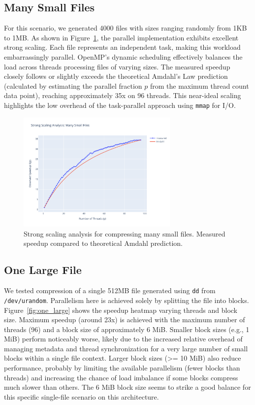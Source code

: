 \documentclass[10pt]{article}
\begin{document}
\subsection*{Many Small Files}
For this scenario, we generated 4000 files with sizes ranging randomly from 1KB to 1MB. As shown in Figure~\ref{fig:many_small}, the parallel implementation exhibits excellent strong scaling. Each file represents an independent task, making this workload embarrassingly parallel. OpenMP's dynamic scheduling effectively balances the load across threads processing files of varying sizes. The measured speedup closely follows or slightly exceeds the theoretical Amdahl's Law prediction (calculated by estimating the parallel fraction $p$ from the maximum thread count data point), reaching approximately 35x on 96 threads. This near-ideal scaling highlights the low overhead of the task-parallel approach using \texttt{mmap} for I/O.

\begin{figure}[hbpt]
    \centering
    \includegraphics[width=0.7\textwidth]{../results/plots/many_small/speedup_many_small.pdf}
    \caption{Strong scaling analysis for compressing many small files. Measured speedup compared to theoretical Amdahl prediction.}
    \label{fig:many_small}
\end{figure}

\subsection*{One Large File}
We tested compression of a single 512MB file generated using \texttt{dd} from \texttt{/dev/urandom}. Parallelism here is achieved solely by splitting the file into blocks. Figure~\ref{fig:one_large} shows the speedup heatmap varying threads and block size. Maximum speedup (around 23x) is achieved with the maximum number of threads (96) and a block size of approximately 6 MiB. Smaller block sizes (e.g., 1 MiB) perform noticeably worse, likely due to the increased relative overhead of managing metadata and thread synchronization for a very large number of small blocks within a single file context. Larger block sizes (>= 10 MiB) also reduce performance, probably by limiting the available parallelism (fewer blocks than threads) and increasing the chance of load imbalance if some blocks compress much slower than others. The 6 MiB block size seems to strike a good balance for this specific single-file scenario on this architecture.
\end{document}
